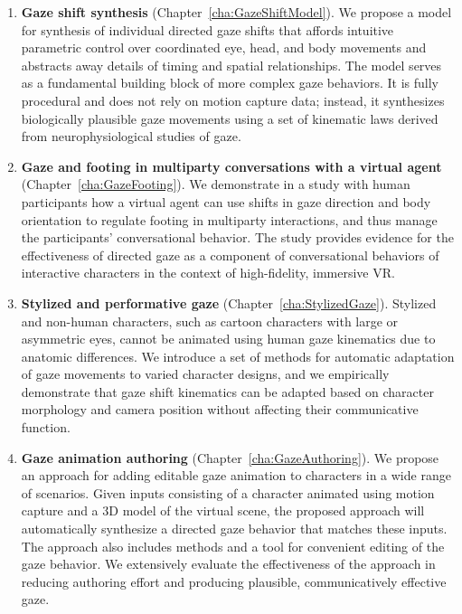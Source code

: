 \begin{enumerate}
\item \textbf{Gaze shift synthesis} (Chapter~\ref{cha:GazeShiftModel}). We propose a model for synthesis of individual directed gaze shifts that affords intuitive parametric control over coordinated eye, head, and body movements and abstracts away details of timing and spatial relationships. The model serves as a fundamental building block of more complex gaze behaviors. It is fully procedural and does not rely on motion capture data; instead, it synthesizes biologically plausible gaze movements using a set of kinematic laws derived from neurophysiological studies of gaze.
\item \textbf{Gaze and footing in multiparty conversations with a virtual agent} (Chapter~\ref{cha:GazeFooting}). We demonstrate in a study with human participants how a virtual agent can use shifts in gaze direction and body orientation to regulate footing in multiparty interactions, and thus manage the participants' conversational behavior. The study provides evidence for the effectiveness of directed gaze as a component of conversational behaviors of interactive characters in the context of high-fidelity, immersive VR.
\item \textbf{Stylized and performative gaze} (Chapter~\ref{cha:StylizedGaze}). Stylized and non-human characters, such as cartoon characters with large or asymmetric eyes, cannot be animated using human gaze kinematics due to anatomic differences. We introduce a set of methods for automatic adaptation of gaze movements to varied character designs, and we empirically demonstrate that gaze shift kinematics can be adapted based on character morphology and camera position without affecting their communicative function.
\item \textbf{Gaze animation authoring} (Chapter~\ref{cha:GazeAuthoring}). We propose an approach for adding editable gaze animation to characters in a wide range of scenarios. Given inputs consisting of a character animated using motion capture and a 3D model of the virtual scene, the proposed approach will automatically synthesize a directed gaze behavior that matches these inputs. The approach also includes methods and a tool for convenient editing of the gaze behavior. We extensively evaluate the effectiveness of the approach in reducing authoring effort and producing plausible, communicatively effective gaze.
\end{enumerate}

